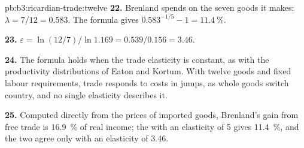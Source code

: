 \begin{solution}{pb:b3:ricardian-trade:twelve}
\textbf{22.} Brenland spends on the seven goods it makes: $\lambda = 7/12 = 0.583$. The
formula gives $0.583^{-1/5} - 1 = 11.4~\%$.

\textbf{23.} $\varepsilon = \ln(12/7)/\ln 1.169 = 0.539/0.156 = 3.46$.

\textbf{24.} The formula holds when the trade elasticity is constant, as with
the productivity distributions of Eaton and Kortum. With twelve goods and fixed
labour requirements, trade responds to costs in jumps, as whole goods switch
country, and no single elasticity describes it.

\textbf{25.} Computed directly from the prices of imported goods, Brenland's gain
from free trade is 16.9~\% of real income; the  with an
elasticity of 5 gives 11.4~\%, and the two agree only with an elasticity of 3.46.
\end{solution}

